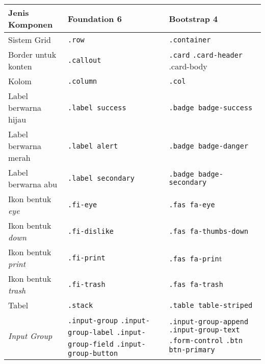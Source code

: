 \begin{tabular}{| p{} | p{} | p{} |} 
	\hline
	\textbf{Jenis Komponen} & \textbf{Foundation 6} & \textbf{Bootstrap 4}  \\ [0.5ex] 
	\hline	
	Sistem Grid & \texttt{.row} &   \texttt{.container} \\ 
	\hline	
	Border untuk konten & \texttt{.callout} &  \texttt{.card} \newline \texttt{.card-header} \newline .card-body \\
	\hline
	Kolom & \texttt{.column} &  \texttt{.col} \\	
	\hline	
	Label berwarna hijau & \texttt{.label success} &  \texttt{.badge badge-success} \\
	\hline	
	Label berwarna merah &\texttt{.label alert} & \texttt{.badge badge-danger}  \\
	\hline	
	Label berwarna abu & \texttt{.label secondary} & \texttt{.badge badge-secondary}  \\
	\hline	
	Ikon bentuk \textit{eye} & \texttt{.fi-eye} &  \texttt{.fas fa-eye} \\	
	\hline	
	Ikon bentuk \textit{down} & \texttt{.fi-dislike} &  \texttt{.fas fa-thumbs-down} \\	
	\hline
	Ikon bentuk \textit{print} & \texttt{.fi-print} &  \texttt{.fas fa-prin}t \\	
	\hline
	Ikon bentuk \textit{trash} & \texttt{.fi-trash} &  \texttt{.fas fa-trash} \\	
	\hline
	Tabel & \texttt{.stack} & \texttt{.table table-striped}  \\
	\hline	
	\textit{Input Group} & \texttt{.input-group} \newline \texttt{.input-group-label} \newline \texttt{.input-group-field} \newline \texttt{.input-group-button} & \texttt{.input-group-append} \newline \texttt{.input-group-text} \newline \texttt{.form-control} \newline \texttt{.btn btn-primary} \\[1ex]
	\hline	
\end{tabular}

